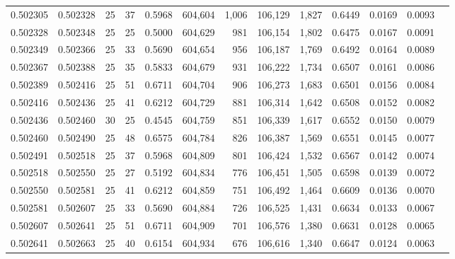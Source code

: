 \begin{tabular}{rrrrrrrrrrrrr}
0.502305 & 0.502328 &    25 &  37 &                                     0.5968 & 604,604 &   1,006 & 106,129 &   1,827 & 0.6449 & 0.0169 & 0.0093 \\
0.502328 & 0.502348 &    25 &  25 &                                     0.5000 & 604,629 &     981 & 106,154 &   1,802 & 0.6475 & 0.0167 & 0.0091 \\
0.502349 & 0.502366 &    25 &  33 &                                     0.5690 & 604,654 &     956 & 106,187 &   1,769 & 0.6492 & 0.0164 & 0.0089 \\
0.502367 & 0.502388 &    25 &  35 &                                     0.5833 & 604,679 &     931 & 106,222 &   1,734 & 0.6507 & 0.0161 & 0.0086 \\
0.502389 & 0.502416 &    25 &  51 &                                     0.6711 & 604,704 &     906 & 106,273 &   1,683 & 0.6501 & 0.0156 & 0.0084 \\
0.502416 & 0.502436 &    25 &  41 &                                     0.6212 & 604,729 &     881 & 106,314 &   1,642 & 0.6508 & 0.0152 & 0.0082 \\
0.502436 & 0.502460 &    30 &  25 &                                     0.4545 & 604,759 &     851 & 106,339 &   1,617 & 0.6552 & 0.0150 & 0.0079 \\
0.502460 & 0.502490 &    25 &  48 &                                     0.6575 & 604,784 &     826 & 106,387 &   1,569 & 0.6551 & 0.0145 & 0.0077 \\
0.502491 & 0.502518 &    25 &  37 &                                     0.5968 & 604,809 &     801 & 106,424 &   1,532 & 0.6567 & 0.0142 & 0.0074 \\
0.502518 & 0.502550 &    25 &  27 &                                     0.5192 & 604,834 &     776 & 106,451 &   1,505 & 0.6598 & 0.0139 & 0.0072 \\
0.502550 & 0.502581 &    25 &  41 &                                     0.6212 & 604,859 &     751 & 106,492 &   1,464 & 0.6609 & 0.0136 & 0.0070 \\
0.502581 & 0.502607 &    25 &  33 &                                     0.5690 & 604,884 &     726 & 106,525 &   1,431 & 0.6634 & 0.0133 & 0.0067 \\
0.502607 & 0.502641 &    25 &  51 &                                     0.6711 & 604,909 &     701 & 106,576 &   1,380 & 0.6631 & 0.0128 & 0.0065 \\
0.502641 & 0.502663 &    25 &  40 &                                     0.6154 & 604,934 &     676 & 106,616 &   1,340 & 0.6647 & 0.0124 & 0.0063 \\

\end{tabular}
